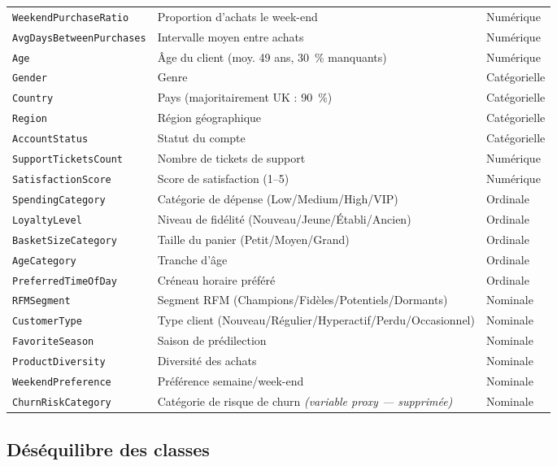 \documentclass[11pt,a4paper]{article}
\begin{document}
\begin{longtable}{L{4.5cm} L{6cm} C{3cm}}
\texttt{WeekendPurchaseRatio} & Proportion d'achats le week-end & Numérique \\
\texttt{AvgDaysBetweenPurchases} & Intervalle moyen entre achats & Numérique \\
\midrule
\texttt{Age} & Âge du client (moy. 49 ans, 30~\% manquants) & Numérique \\
\texttt{Gender} & Genre & Catégorielle \\
\texttt{Country} & Pays (majoritairement UK : 90~\%) & Catégorielle \\
\texttt{Region} & Région géographique & Catégorielle \\
\texttt{AccountStatus} & Statut du compte & Catégorielle \\
\texttt{SupportTicketsCount} & Nombre de tickets de support & Numérique \\
\texttt{SatisfactionScore} & Score de satisfaction (1--5) & Numérique \\
\midrule
\texttt{SpendingCategory} & Catégorie de dépense (Low/Medium/High/VIP) & Ordinale \\
\texttt{LoyaltyLevel} & Niveau de fidélité (Nouveau/Jeune/Établi/Ancien) & Ordinale \\
\texttt{BasketSizeCategory} & Taille du panier (Petit/Moyen/Grand) & Ordinale \\
\texttt{AgeCategory} & Tranche d'âge & Ordinale \\
\texttt{PreferredTimeOfDay} & Créneau horaire préféré & Ordinale \\
\midrule
\texttt{RFMSegment} & Segment RFM (Champions/Fidèles/Potentiels/Dormants) & Nominale \\
\texttt{CustomerType} & Type client (Nouveau/Régulier/Hyperactif/Perdu/Occasionnel) & Nominale \\
\texttt{FavoriteSeason} & Saison de prédilection & Nominale \\
\texttt{ProductDiversity} & Diversité des achats & Nominale \\
\texttt{WeekendPreference} & Préférence semaine/week-end & Nominale \\
\texttt{ChurnRiskCategory} & Catégorie de risque de churn \emph{(variable proxy — supprimée)} & Nominale \\
\end{longtable}

\subsection{Déséquilibre des classes}
\end{document}

